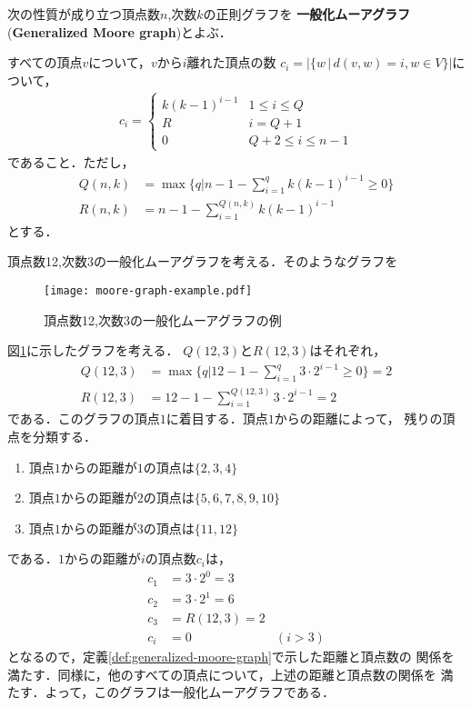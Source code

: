 \begin{definition}
  \label{def:generalized-moore-graph}
  次の性質が成り立つ頂点数$n$,次数$k$の正則グラフを
  \textbf{一般化ムーアグラフ}(\textbf{Generalized Moore graph})とよぶ．

  すべての頂点$v$について，$v$から$i$離れた頂点の数
  $c_i = \lvert\{ w\,|\,d(v,w) = i , w\in V \}\rvert$について，
  \begin{equation}
    \label{eq:gmg-verts-dist}
    \begin{aligned}
      c_i =
      \begin{cases}
        k(k-1)^{i-1} & 1\leq i\leq Q \\
        R & i = Q+1 \\
        0 & Q+2\leq i \leq n-1
      \end{cases}
    \end{aligned}
  \end{equation}
  であること．ただし，
  \begin{align*}
    Q(n,k) &= \max\{q | n-1-\sum_{i=1}^{q}k(k-1)^{i-1} \geq 0\} \\
    R(n,k) &= n - 1 - \sum_{i=1}^{Q(n,k)}k(k-1)^{i-1}
  \end{align*}
  とする．
\end{definition}
\begin{example}
  頂点数12,次数3の一般化ムーアグラフを考える．そのようなグラフを
  \begin{figure}
    \centering
    \texttt{[image: moore-graph-example.pdf]}
    \caption{頂点数12,次数3の一般化ムーアグラフの例}
    \label{fig:moore-graph-example}
  \end{figure}
  図\ref{fig:moore-graph-example}に示したグラフを考える．
  $Q(12,3)$と$R(12,3)$はそれぞれ，
  \begin{align*}
    Q(12,3) &= \max\{q | 12-1-\sum_{i=1}^{q}3\cdot2^{i-1} \geq 0\} = 2 \\
    R(12,3) &= 12 - 1 - \sum_{i=1}^{Q(12,3)}3\cdot2^{i-1} = 2
  \end{align*}
  である．このグラフの頂点$1$に着目する．頂点$1$からの距離によって，
  残りの頂点を分類する．
  \begin{enumerate}
  \item 頂点$1$からの距離が$1$の頂点は$\{2,3,4\}$
  \item 頂点$1$からの距離が$2$の頂点は$\{5,6,7,8,9,10\}$
  \item 頂点$1$からの距離が$3$の頂点は$\{11,12\}$
  \end{enumerate}
  である．$1$からの距離が$i$の頂点数$c_i$は，
  \begin{align*}
  c_1 &= 3\cdot2^0 = 3 & \\
  c_2 &= 3\cdot2^1 = 6 & \\
  c_3 &= R(12,3) = 2 & \\
  c_i &= 0 & (i>3)
  \end{align*}
  となるので，定義\ref{def:generalized-moore-graph}で示した距離と頂点数の
  関係を満たす．同様に，他のすべての頂点について，上述の距離と頂点数の関係を
  満たす．よって，このグラフは一般化ムーアグラフである．
\end{example}
